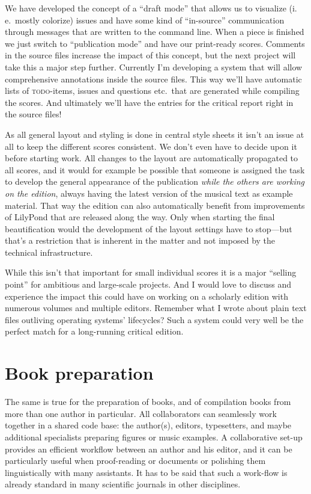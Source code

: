 \documentclass[DIV=12]{scrreprt}
\begin{document}
We have developed the concept of a “draft mode” that allows us to visualize (i.\,e.\ mostly colorize) issues and have some kind of “in-source” communication through messages that are written to the command line.
When a piece is finished we just switch to “publication mode” and have our print-ready scores.
Comments in the source files increase the impact of this concept, but the next project will take this a major step further.
Currently I'm developing a system that will allow comprehensive annotations inside the source files.
This way we'll have automatic lists of \textsc{todo}-items, issues and questions etc.\ that are generated while compiling the scores.
And ultimately we'll have the entries for the critical report right in the source files!

As all general layout and styling is done in central style sheets it isn't an issue at all to keep the different scores consistent. We don't even have to decide upon it before starting work.
All changes to the layout are automatically propagated to all scores, and it would for example be possible that someone is assigned the task to develop the general appearance of the publication \emph{while the others are working on the edition}, always having the latest version of the musical text as example material.
That way the edition can also automatically benefit from improvements of LilyPond that are released along the way.
Only when starting the final beautification would the development of the layout settings have to stop---but that's a restriction that is inherent in the matter and not imposed by the technical infrastructure.

While this isn't that important for small individual scores it is a major “selling point” for ambitious and large-scale projects.
And I would love to discuss and experience the impact this could have on working on a scholarly edition with numerous volumes and multiple editors.
Remember what I wrote about plain text files outliving operating systems' lifecycles?
Such a system could very well be the perfect match for a long-running critical edition.

\section{Book preparation}
The same is true for the preparation of books, and of compilation books from more than one author in particular.
All collaborators can seamlessly work together in a shared code base: the author(s), editors, typesetters, and maybe additional specialists preparing figures or music examples.
A collaborative set-up provides an efficient workflow between an author and his editor, and it can be particularly useful when proof-reading or documents or polishing them linguistically with many assistants.
It has to be said that such a work-flow is already standard in many scientific journals in other disciplines.
\end{document}
